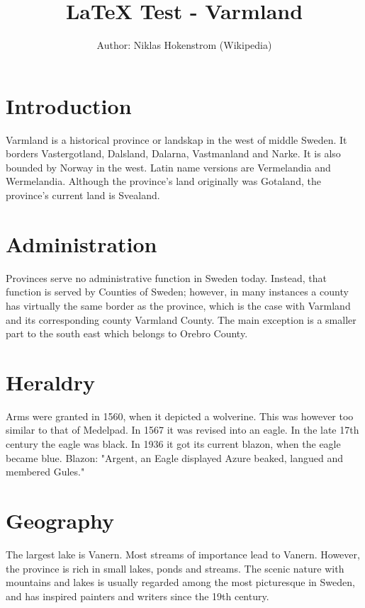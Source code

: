 \documentclass[a4paper, 11pt]{article}
\begin{document}
\title{\LaTeX{} Test - Varmland}
\author{Author: Niklas Hokenstrom (Wikipedia)}

\maketitle

\section{Introduction}
Varmland is a historical province or landskap in the west of middle Sweden. It borders Vastergotland, Dalsland, Dalarna, Vastmanland and Narke. It is also bounded by Norway in the west. Latin name versions are Vermelandia and Wermelandia. Although the province's land originally was Gotaland, the province's current land is Svealand.

\section{Administration}
Provinces serve no administrative function in Sweden today. Instead, that function is served by Counties of Sweden; however, in many instances a county has virtually the same border as the province, which is the case with Varmland and its corresponding county Varmland County. The main exception is a smaller part to the south east which belongs to Orebro County.

\section{Heraldry}
Arms were granted in 1560, when it depicted a wolverine. This was however too similar to that of Medelpad. In 1567 it was revised into an eagle. In the late 17th century the eagle was black. In 1936 it got its current blazon, when the eagle became blue. Blazon: "Argent, an Eagle displayed Azure beaked, langued and membered Gules."

\section{Geography}
The largest lake is Vanern. Most streams of importance lead to Vanern. However, the province is rich in small lakes, ponds and streams. The scenic nature with mountains and lakes is usually regarded among the most picturesque in Sweden, and has inspired painters and writers since the 19th century.

\end{document}
